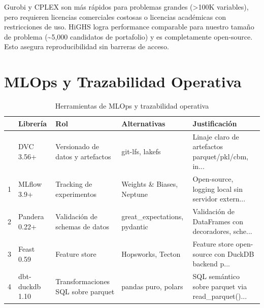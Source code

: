 \documentclass[
  spanish,
  11pt,
  letterpaper,
]{scrbook}
\theoremstyle{plain}
\theoremstyle{remark}
\begin{document}
\begin{tcolorbox}[enhanced jigsaw, arc=.35mm, bottomrule=.15mm, bottomtitle=1mm, breakable, colback=white, colbacktitle=quarto-callout-tip-color!10!white, colframe=quarto-callout-tip-color-frame, coltitle=black, left=2mm, leftrule=.75mm, opacityback=0, opacitybacktitle=0.6, rightrule=.15mm, title=\textcolor{quarto-callout-tip-color}{\faLightbulb}\hspace{0.5em}{¿Por qué HiGHS y no Gurobi?}, titlerule=0mm, toprule=.15mm, toptitle=1mm]

Gurobi y CPLEX son más rápidos para problemas grandes (\textgreater100K
variables), pero requieren licencias comerciales costosas o licencias
académicas con restricciones de uso. HiGHS logra performance comparable
para nuestro tamaño de problema (\textasciitilde5,000 candidatos de
portafolio) y es completamente open-source. Esto asegura
reproducibilidad sin barreras de acceso.

\end{tcolorbox}

\section{MLOps y Trazabilidad
Operativa}\label{mlops-y-trazabilidad-operativa}

{

\begin{longtable}[]{@{}lllll@{}}

\caption{\label{tbl-mlops-stack}Herramientas de MLOps y trazabilidad
operativa}

\tabularnewline

\toprule\noalign{}
& Librería & Rol & Alternativas & Justificación \\
\midrule\noalign{}
\endhead
\bottomrule\noalign{}
\endlastfoot
0 & DVC 3.56+ & Versionado de datos y artefactos & git-lfs, lakefs &
Linaje claro de artefactos parquet/pkl/cbm, in... \\
1 & MLflow 3.9+ & Tracking de experimentos & Weights \& Biases, Neptune
& Open-source, logging local sin servidor extern... \\
2 & Pandera 0.22+ & Validación de schemas de datos &
great\_expectations, pydantic & Validación de DataFrames con
decoradores, sche... \\
3 & Feast 0.59 & Feature store & Hopsworks, Tecton & Feature store
open-source con DuckDB backend p... \\
4 & dbt-duckdb 1.10 & Transformaciones SQL sobre parquet & pandas puro,
polars & SQL semántico sobre parquet via read\_parquet()... \\

\end{longtable}

}
\end{document}
